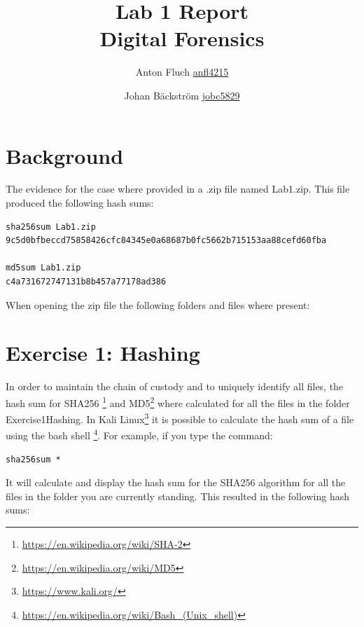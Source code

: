 \documentclass[a4paper,10pt,oneside]{article}
\title{Lab 1 Report \\ Digital Forensics}
\author{Anton Fluch \url{anfl4215} \and Johan Bäckström \url{jobc5829}}
\begin{document}
\maketitle
\newpage

\tableofcontents
\newpage

\section{Background}
The evidence for the case where provided in a .zip file named Lab1.zip. This file produced the following hash sums:


\begin{lstlisting}[caption=SHA256 and MD5 sum for Lab1.zip]
sha256sum Lab1.zip
9c5d0bfbeccd75858426cfc84345e0a68687b0fc5662b715153aa88cefd60fba

md5sum Lab1.zip
c4a731672747131b8b457a77178ad386
\end{lstlisting}
When opening the zip file the following folders and files where present:

\newpage

\section{Exercise 1: Hashing}
In order to maintain the chain of custody and to uniquely identify all files, the hash sum for SHA256
\footnote{\url{https://en.wikipedia.org/wiki/SHA-2}} and MD5\footnote{\url{https://en.wikipedia.org/wiki/MD5}}
where calculated for all the files in the folder Exercise1\textunderscore Hashing. In Kali Linux\footnote{\url{https://www.kali.org/}}
it is possible to calculate the hash sum of a file using the bash shell \footnote{\url{https://en.wikipedia.org/wiki/Bash_(Unix_shell)}}.
For example, if you type the command:
\begin{lstlisting}[caption= calculate sha256 sum of all files in folder]
sha256sum *
\end{lstlisting}
It will calculate and display the hash sum for the SHA256 algorithm for all the files in the folder you are currently standing.
This resulted in the following hash sums:
\end{document}
